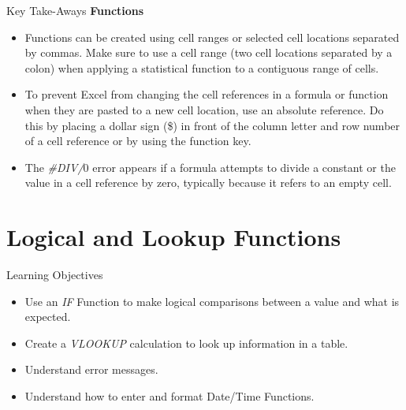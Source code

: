 \begin{center}
	\begin{tkwbox}{Key Take-Aways}
		\textbf{Functions}
		\\
		\begin{itemize}
			\setlength{\itemsep}{0pt}
			\setlength{\parskip}{0pt}
			\setlength{\parsep}{0pt}

			\item Functions can be created using cell ranges or selected cell locations separated by commas. Make sure to use a cell range (two cell locations separated by a colon) when applying a statistical function to a contiguous range of cells.
			\item To prevent Excel from changing the cell references in a formula or function when they are pasted to a new cell location, use an absolute reference. Do this by placing a dollar sign (\$) in front of the column letter and row number of a cell reference or by using the  function key.
			\item The \textit{\#DIV/$ 0 $} error appears if a formula attempts to divide a constant or the value in a cell reference by zero, typically because it refers to an empty cell.
			
		\end{itemize}
	\end{tkwbox}
\end{center}

\section{Logical and Lookup Functions}

\begin{center}
	\begin{objbox}{Learning Objectives}
		\begin{itemize}
			\setlength{\itemsep}{0pt}
			\setlength{\parskip}{0pt}
			\setlength{\parsep}{0pt}

			\item Use an \textit{IF} Function to make logical comparisons between a value and what is expected.
			\item Create a \textit{VLOOKUP} calculation to look up information in a table.
			\item Understand error messages.
			\item Understand how to enter and format Date/Time Functions.
			
		\end{itemize}
	\end{objbox}
\end{center}

